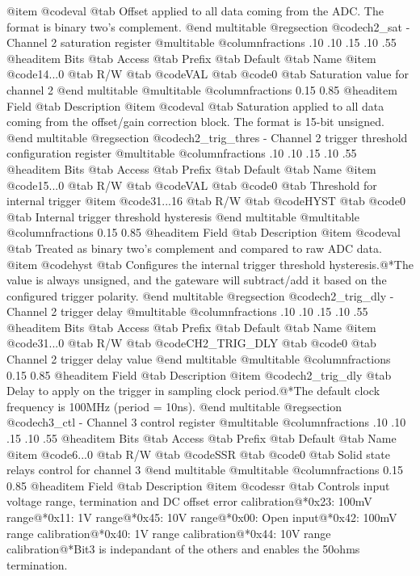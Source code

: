 @item @code{val} @tab Offset applied to all data coming from the ADC. The format is binary two's complement.
@end multitable
@regsection @code{ch2_sat} - Channel 2 saturation register
@multitable @columnfractions .10 .10 .15 .10 .55
@headitem Bits @tab Access @tab Prefix @tab Default @tab Name
@item @code{14...0}
@tab R/W @tab
@code{VAL}
@tab @code{0} @tab 
Saturation value for channel 2
@end multitable
@multitable @columnfractions 0.15 0.85
@headitem Field @tab Description
@item @code{val} @tab Saturation applied to all data coming from the offset/gain correction block. The format is 15-bit unsigned.
@end multitable
@regsection @code{ch2_trig_thres} - Channel 2 trigger threshold configuration register
@multitable @columnfractions .10 .10 .15 .10 .55
@headitem Bits @tab Access @tab Prefix @tab Default @tab Name
@item @code{15...0}
@tab R/W @tab
@code{VAL}
@tab @code{0} @tab 
Threshold for internal trigger
@item @code{31...16}
@tab R/W @tab
@code{HYST}
@tab @code{0} @tab 
Internal trigger threshold hysteresis
@end multitable
@multitable @columnfractions 0.15 0.85
@headitem Field @tab Description
@item @code{val} @tab Treated as binary two's complement and compared to raw ADC data.
@item @code{hyst} @tab Configures the internal trigger threshold hysteresis.@*The value is always unsigned, and the gateware will subtract/add it based on the configured trigger polarity.
@end multitable
@regsection @code{ch2_trig_dly} - Channel 2 trigger delay
@multitable @columnfractions .10 .10 .15 .10 .55
@headitem Bits @tab Access @tab Prefix @tab Default @tab Name
@item @code{31...0}
@tab R/W @tab
@code{CH2_TRIG_DLY}
@tab @code{0} @tab 
Channel 2 trigger delay value
@end multitable
@multitable @columnfractions 0.15 0.85
@headitem Field @tab Description
@item @code{ch2_trig_dly} @tab Delay to apply on the trigger in sampling clock period.@*The default clock frequency is 100MHz (period = 10ns).
@end multitable
@regsection @code{ch3_ctl} - Channel 3 control register
@multitable @columnfractions .10 .10 .15 .10 .55
@headitem Bits @tab Access @tab Prefix @tab Default @tab Name
@item @code{6...0}
@tab R/W @tab
@code{SSR}
@tab @code{0} @tab 
Solid state relays control for channel 3
@end multitable
@multitable @columnfractions 0.15 0.85
@headitem Field @tab Description
@item @code{ssr} @tab Controls input voltage range, termination and DC offset error calibration@*0x23: 100mV range@*0x11: 1V range@*0x45: 10V range@*0x00: Open input@*0x42: 100mV range calibration@*0x40: 1V range calibration@*0x44: 10V range calibration@*Bit3 is indepandant of the others and enables the 50ohms termination.
